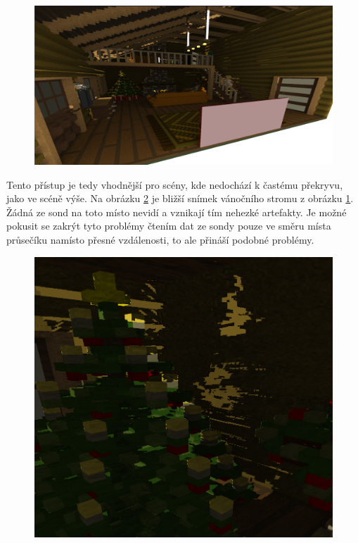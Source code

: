 \begin{figure}[H]
	\centering
	\captionsetup{justification=centering}
	\includegraphics[scale=0.9]{images/render_svo_indirect_1.png}
	\label{fig:render_indirect_1}
\end{figure}

Tento přístup je tedy vhodnější pro scény, kde nedochází k častému překryvu, jako ve scéně výše. Na obrázku \ref{fig:tree_closeup} je bližší snímek vánočního stromu z obrázku \ref{fig:render_indirect_1}. Žádná ze sond na toto místo nevidí a vznikají tím nehezké artefakty. Je možné pokusit se zakrýt tyto problémy čtením dat ze sondy pouze ve směru místa průsečíku namísto přesné vzdálenosti, to ale přináší podobné problémy. 

\begin{figure}[H]
	\centering
	\captionsetup{justification=centering}
	\includegraphics[scale=1.15]{images/tree_closeup.png}
	\label{fig:tree_closeup}
\end{figure}



